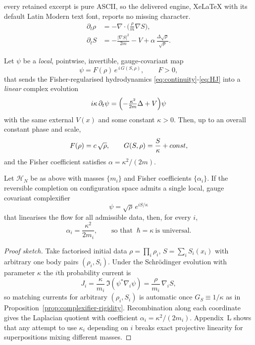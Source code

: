 \documentclass[10pt,a4paper]{amsart}
\begin{document}
every retained excerpt is pure ASCII, so the delivered engine, XeLaTeX with its default Latin Modern text font, reports no missing character.
\begin{align}
	\partial_t \rho &= -\nabla\!\cdot\!\Big(\frac{\rho}{m}\nabla S\Big),
	\label{eq:continuity}\\
	\partial_t S &= -\frac{|\nabla S|^2}{2m}-V
	+\alpha\,\frac{\Delta\sqrt\rho}{\sqrt\rho}.
	\label{eq:HJ}
\end{align}

\begin{proposition}\label{prop:complexifier-rigidity}
	Let $\psi$ be a \emph{local}, pointwise, invertible, gauge-covariant map
	\[
	\psi=F(\rho)\,e^{\,i\,G(S,\rho)},\qquad F>0,
	\]
	that sends the Fisher-regularised hydrodynamics \eqref{eq:continuity}-\eqref{eq:HJ} into a \emph{linear} complex evolution
	\[
	i\kappa\,\partial_t\psi=\Bigl(-\tfrac{\kappa^2}{2m}\Delta+V\Bigr)\psi
	\]
	with the same external $V(x)$ and some constant $\kappa>0$. Then, up to an overall constant phase and scale,
	\[
	F(\rho)=c\,\sqrt{\rho},\qquad G(S,\rho)=\frac{S}{\kappa}+{\rm const},
	\]
	and the Fisher coefficient satisfies $\alpha=\kappa^2/(2m)$.
\end{proposition}

\begin{proposition}\label{prop:hbarUniversality}
	Let $\mathcal H_N$ be as above with masses $\{m_i\}$ and Fisher coefficients
	$\{\alpha_i\}$. If the reversible completion on configuration space admits a
	single local, gauge covariant complexifier
	\[
	\psi=\sqrt\rho\,e^{iS/\kappa}
	\]
	that linearises the flow for all admissible data, then, for every \(i\),
	\[
	\alpha_i=\frac{\kappa^{2}}{2m_i},\qquad
	\text{so that } \ \hbar=\kappa \ \text{is universal.}
	\]
\end{proposition}

\begin{proof}[Proof sketch]
	Take factorised initial data \(\rho=\prod_i \rho_i\),
	\(S=\sum_i S_i(x_i)\) with arbitrary one body pairs \((\rho_i,S_i)\).
	Under the Schr\"odinger evolution with parameter \(\kappa\) the \(i\)th
	probability current is
	\[
	J_i=\frac{\kappa}{m_i}\,\Im(\psi^{*}\nabla_i\psi)
	=\frac{\rho}{m_i}\,\nabla_i S,
	\]
	so matching currents for arbitrary \((\rho_i,S_i)\) is automatic once
	\(G_S\equiv 1/\kappa\) as in Proposition~\ref{prop:complexifier-rigidity}.
	Recombination along each coordinate gives the Laplacian quotient with
	coefficient \(\alpha_i=\kappa^{2}/(2m_i)\). Appendix~L shows that any
	attempt to use \(\kappa_i\) depending on \(i\) breaks exact projective
	linearity for superpositions mixing different masses.
\end{proof}
\end{document}
